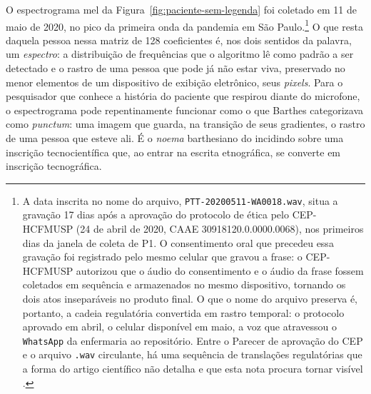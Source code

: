 O espectrograma mel da Figura~\ref{fig:paciente-sem-legenda} foi coletado em 11 de maio de 2020, no pico da primeira onda da pandemia em São Paulo.\footnote{A data inscrita no nome do arquivo, \texttt{PTT-20200511-WA0018.wav}, situa a gravação 17 dias após a aprovação do protocolo de ética pelo CEP-HCFMUSP (24 de abril de 2020, CAAE 30918120.0.0000.0068), nos primeiros dias da janela de coleta de P1. O consentimento oral que precedeu essa gravação foi registrado pelo mesmo celular que gravou a frase: o CEP-HCFMUSP autorizou que o áudio do consentimento e o áudio da frase fossem coletados em sequência e armazenados no mesmo dispositivo, tornando os dois atos inseparáveis no produto final. O que o nome do arquivo preserva é, portanto, a cadeia regulatória convertida em rastro temporal: o protocolo aprovado em abril, o celular disponível em maio, a voz que atravessou o \texttt{WhatsApp} da enfermaria ao repositório. Entre o Parecer de aprovação do CEP e o arquivo \texttt{.wav} circulante, há uma sequência de translações regulatórias que a forma do artigo científico não detalha e que esta nota procura tornar visível \parencite{Berti2023Frequency,Berti2025Healthcare,Finger2025SPIRABM}.} O que resta daquela pessoa nessa matriz de 128 coeficientes é, nos dois sentidos da palavra, um \textit{espectro}: a distribuição de frequências que o algoritmo lê como padrão a ser detectado e o rastro de uma pessoa que pode já não estar viva, preservado no menor elementos de um dispositivo de exibição eletrônico, seus \textit{pixels}. Para o pesquisador que conhece a história do paciente que respirou diante do microfone, o espectrograma pode repentinamente funcionar como o que Barthes categorizava como \textit{punctum}: uma imagem que guarda, na transição de seus gradientes, o rastro de uma pessoa que esteve ali. É o \textit{noema} barthesiano do  incidindo sobre uma inscrição tecnocientífica que, ao entrar na escrita etnográfica, se converte em inscrição tecnográfica. 

